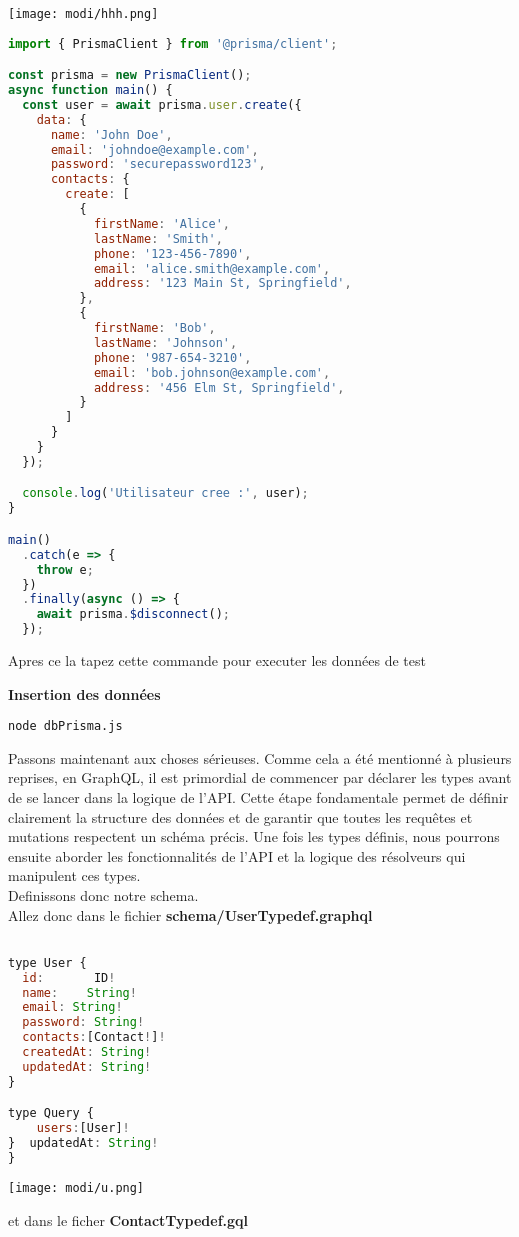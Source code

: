 \documentclass{article}
\begin{document}
\begin{center} 
    \texttt{[image: modi/hhh.png]} 
\end{center}
\begin{lstlisting}[language=JavaScript]
import { PrismaClient } from '@prisma/client';

const prisma = new PrismaClient();
async function main() {
  const user = await prisma.user.create({
    data: {
      name: 'John Doe',
      email: 'johndoe@example.com',
      password: 'securepassword123',  
      contacts: {
        create: [
          {
            firstName: 'Alice',
            lastName: 'Smith',
            phone: '123-456-7890',
            email: 'alice.smith@example.com',
            address: '123 Main St, Springfield',
          },
          {
            firstName: 'Bob',
            lastName: 'Johnson',
            phone: '987-654-3210',
            email: 'bob.johnson@example.com',
            address: '456 Elm St, Springfield',
          }
        ]
      }
    }
  });

  console.log('Utilisateur cree :', user);
}

main()
  .catch(e => {
    throw e;
  })
  .finally(async () => {
    await prisma.$disconnect();
  });

\end{lstlisting}
Apres ce la tapez cette commande pour executer les données de test 
    \item \textbf{Insertion des données}
    \begin{lstlisting}[style=custombash]
 node dbPrisma.js 
    \end{lstlisting}

    

    
Passons maintenant aux choses sérieuses. Comme cela a été mentionné à plusieurs reprises, en GraphQL, il est primordial de commencer par déclarer les types avant de se lancer dans la logique de l'API. Cette étape fondamentale permet de définir clairement la structure des données et de garantir que toutes les requêtes et mutations respectent un schéma précis. Une fois les types définis, nous pourrons ensuite aborder les fonctionnalités de l'API et la logique des résolveurs qui manipulent ces types.\\
Definissons donc notre schema.  \\ Allez donc dans le fichier \textbf{schema/UserTypedef.graphql}



\begin{lstlisting}[language=JavaScript]

type User {
  id:       ID!      
  name:    String!   
  email: String!   
  password: String!
  contacts:[Contact!]!   
  createdAt: String!  
  updatedAt: String!   
}

type Query {
    users:[User]!
}  updatedAt: String!   
}
 \end{lstlisting}
\begin{center} 
    \texttt{[image: modi/u.png]} 
\end{center}
et dans le ficher \textbf{ContactTypedef.gql} 
\end{document}
